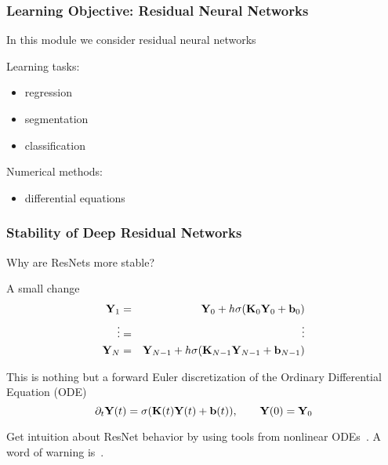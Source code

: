 \documentclass[12pt,fleqn,beamer]{beamer}
\begin{document}
\begin{frame}
	\frametitle{Learning Objective: Residual Neural Networks}
	
	In this module we consider residual neural networks
	
	\bigskip
	
	Learning tasks:
	\begin{itemize}
		\item regression
		\item segmentation
		\item classification
	\end{itemize}
	
	\bigskip
	
	Numerical methods:
	\begin{itemize}
		\item differential equations
	\end{itemize}
\end{frame}


\begin{frame}\frametitle{Stability of Deep Residual Networks}

Why are ResNets more stable?

A small change
\begin{eqnarray*}
{\bf Y}_1 &=& {\bf Y}_0 + h \sigma({\bf K}_0 {\bf Y}_0  + {\bf b}_0) \\
\vdots &=& \vdots \\
 {\bf Y}_N &=& {\bf Y}_{N-1} + h\sigma({\bf K}_{N-1} {\bf Y}_{N-1} + {\bf b}_{N-1})
 \end{eqnarray*}

\bigskip
\pause 

This is nothing but a forward Euler discretization
of the  Ordinary Differential Equation (ODE)
$$ \partial_t {\bf Y}(t) = \sigma({\bf K}(t) {\bf Y}(t)  + {\bf b}(t)), \quad \quad {\bf Y}(0) = {\bf Y}_0 $$

Get intuition about ResNet behavior by using tools from nonlinear ODEs~\cite{HaberRuthotto2017,E2017}. A word of warning is~\cite{ascher2019discrete}.

\end{frame}

\end{document}
